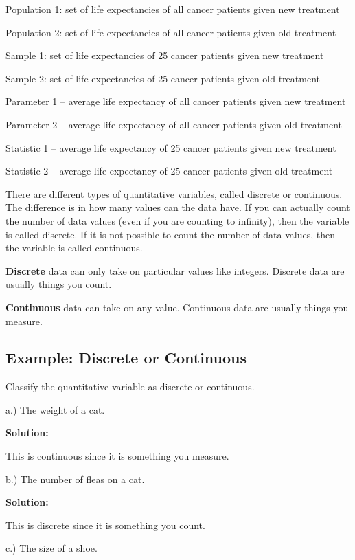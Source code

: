 \documentclass[
]{book}
\begin{document}
Population 1: set of life expectancies of all cancer patients given new treatment

Population 2: set of life expectancies of all cancer patients given old treatment

Sample 1: set of life expectancies of 25 cancer patients given new treatment

Sample 2: set of life expectancies of 25 cancer patients given old treatment

Parameter 1 -- average life expectancy of all cancer patients given new treatment

Parameter 2 -- average life expectancy of all cancer patients given old treatment

Statistic 1 -- average life expectancy of 25 cancer patients given new treatment

Statistic 2 -- average life expectancy of 25 cancer patients given old treatment

There are different types of quantitative variables, called discrete or continuous. The difference is in how many values can the data have. If you can actually count the number of data values (even if you are counting to infinity), then the variable is called discrete. If it is not possible to count the number of data values, then the variable is called continuous.

\textbf{Discrete} data can only take on particular values like integers. Discrete data are usually things you count.

\textbf{Continuous} data can take on any value. Continuous data are usually things you measure.

\hypertarget{example-discrete-or-continuous}{%
\subsection{Example: Discrete or Continuous}\label{example-discrete-or-continuous}}

Classify the quantitative variable as discrete or continuous.

a.) The weight of a cat.

\textbf{Solution:}

This is continuous since it is something you measure.

b.) The number of fleas on a cat.

\textbf{Solution:}

This is discrete since it is something you count.

c.) The size of a shoe.
\end{document}
